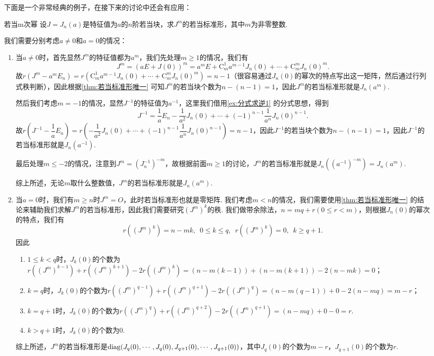 下面是一个非常经典的例子，在接下来的讨论中还会有应用：
\begin{example}{}{若当m次幂}
    设$J=J_n(a)$是特征值为$a$的$n$阶若当块，求$J^m$的若当标准形，其中$m$为非零整数.
\end{example}
\begin{solution}
    我们需要分别考虑$a\neq 0$和$a=0$的情况：
    \begin{enumerate}
        \item 当$a\neq 0$时，首先显然$J^m$的特征值都为$a^m$，我们先处理$m\geqslant 1$的情况，我们有
              \[J^m=(aE+J(0))^m=a^mE+\mathrm{C}_m^1a^{m-1}J_n(0)+\cdots+\mathrm{C}_m^mJ_n(0)^m.\]
              故$r(J^m-a^mE_n)=r(\mathrm{C}_m^1a^{m-1}J_n(0)+\cdots+\mathrm{C}_m^mJ_n(0)^m)=n-1$（很容易通过$J_n(0)$的幂次的特点写出这一矩阵，然后通过行列式秩判断），因此根据\autoref{thm:若当标准形唯一} 可知$J^m$的若当块个数为$n-(n-1)=1$，因此$J^m$的若当标准形就是$J_n(a^m)$.

              然后我们考虑$m=-1$的情况，显然$J^{-1}$的特征值为$a^{-1}$，这里我们借用\autoref{ex:分式求逆1} 的分式思想，得到
              \[J^{-1}=\dfrac{1}{a}E_n-\dfrac{1}{a^2}J_n(0)+\cdots+(-1)^{n-1}\dfrac{1}{a^n}J_n(0)^{n-1}.\]
              故$r(J^{-1}-\dfrac{1}{a}E_n)=r(-\dfrac{1}{a^2}J_n(0)+\cdots+(-1)^{n-1}\dfrac{1}{a^n}J_n(0)^{n-1})=n-1$，因此$J^{-1}$的若当块个数为$n-(n-1)=1$，因此$J^{-1}$的若当标准形就是$J_n(a^{-1})$.

              最后处理$m\leqslant -2$的情况，注意到$J^m=(J_n^{-1})^{-m}$，故根据前面$m\geqslant 1$的讨论，$J^m$的若当标准形就是$J_n((a^{-1})^{-m})=J_n(a^m)$.

              综上所述，无论$m$取什么整数值，$J^m$的若当标准形就是$J_n(a^m)$.

        \item 当$a=0$时，我们有$m\geqslant n$时$J^m=O$，此时若当标准形也就是零矩阵. 我们考虑$m<n$的情况，我们需要使用\autoref{thm:若当标准形唯一} 的结论来辅助我们求解$J^m$的若当标准形，因此我们需要研究$(J^m)^k$的秩. 我们做带余除法，$n=mq+r(0\leqslant r<m)$，则根据$J_n(0)$的幂次的特点，我们有
              \[r((J^m)^k)=n-mk,\enspace 0\leqslant k\leqslant q,\enspace r((J^m)^k)=0,\enspace k\geqslant q+1.\]
              因此
              \begin{enumerate}
                  \item $1\leqslant k<q$时，$J_k(0)$的个数为$r((J^m)^{k-1})+r((J^m)^{k+1})-2r((J^m)^k)=(n-m(k-1))+(n-m(k+1))-2(n-mk)=0$；
                  \item $k=q$时，$J_k(0)$的个数为$r((J^m)^{q-1})+r((J^m)^{q+1})-2r((J^m)^q)=(n-m(q-1))+0-2(n-mq)=m-r$；
                  \item $k=q+1$时，$J_k(0)$的个数为$r((J^m)^q)+r((J^m)^{q+2})-2r((J^m)^{q+1})=(n-mq)+0-0=r$.
                  \item $k>q+1$时，$J_k(0)$的个数为0.
              \end{enumerate}
              综上所述，$J^m$的若当标准形是$\operatorname{diag}(J_q(0),\cdots,J_q(0),J_{q+1}(0),\cdots,J_{q+1}(0))$，其中$J_q(0)$的个数为$m-r$，$J_{q+1}(0)$的个数为$r$.
    \end{enumerate}
\end{solution}

